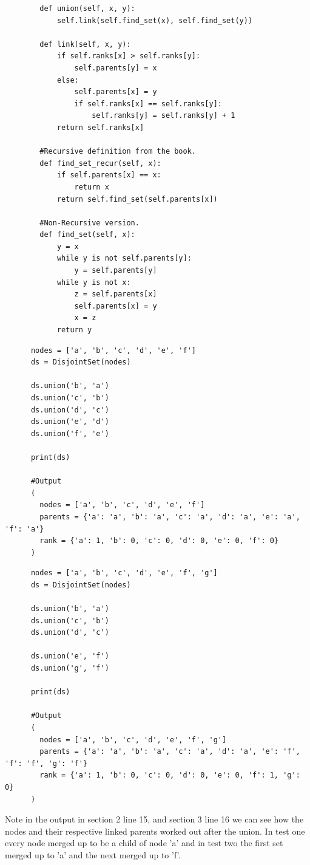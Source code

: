 \documentclass{article}
\begin{document}
\begin{enumerate}
\begin{lstlisting}
        def union(self, x, y):
            self.link(self.find_set(x), self.find_set(y))
    
        def link(self, x, y):
            if self.ranks[x] > self.ranks[y]:
                self.parents[y] = x
            else:
                self.parents[x] = y
                if self.ranks[x] == self.ranks[y]:
                    self.ranks[y] = self.ranks[y] + 1
            return self.ranks[x]
        
        #Recursive definition from the book.
        def find_set_recur(self, x):
            if self.parents[x] == x:
                return x
            return self.find_set(self.parents[x])
        
        #Non-Recursive version.
        def find_set(self, x):
            y = x
            while y is not self.parents[y]:
                y = self.parents[y]
            while y is not x:
                z = self.parents[x]
                self.parents[x] = y
                x = z
            return y           
    \end{lstlisting}

    \begin{lstlisting}
      nodes = ['a', 'b', 'c', 'd', 'e', 'f']    
      ds = DisjointSet(nodes)

      ds.union('b', 'a')
      ds.union('c', 'b')
      ds.union('d', 'c')
      ds.union('e', 'd')
      ds.union('f', 'e')

      print(ds)

      #Output
      (
        nodes = ['a', 'b', 'c', 'd', 'e', 'f']
        parents = {'a': 'a', 'b': 'a', 'c': 'a', 'd': 'a', 'e': 'a', 'f': 'a'}
        rank = {'a': 1, 'b': 0, 'c': 0, 'd': 0, 'e': 0, 'f': 0}
      )
    \end{lstlisting}

    \begin{lstlisting}
      nodes = ['a', 'b', 'c', 'd', 'e', 'f', 'g']
      ds = DisjointSet(nodes)
      
      ds.union('b', 'a')
      ds.union('c', 'b')
      ds.union('d', 'c')
      
      ds.union('e', 'f')
      ds.union('g', 'f')
      
      print(ds)

      #Output
      (
        nodes = ['a', 'b', 'c', 'd', 'e', 'f', 'g']
        parents = {'a': 'a', 'b': 'a', 'c': 'a', 'd': 'a', 'e': 'f', 'f': 'f', 'g': 'f'}
        rank = {'a': 1, 'b': 0, 'c': 0, 'd': 0, 'e': 0, 'f': 1, 'g': 0}
      )
    \end{lstlisting}

    Note in the output in section 2 line 15, and section 3 line 16 we can see how the nodes and their respective linked parents worked out after the union.
    In test one every node merged up to be a child of node 'a' and in test two the first set merged up to 'a' and the next merged up to 'f'.

  \end{enumerate}
\end{document}
